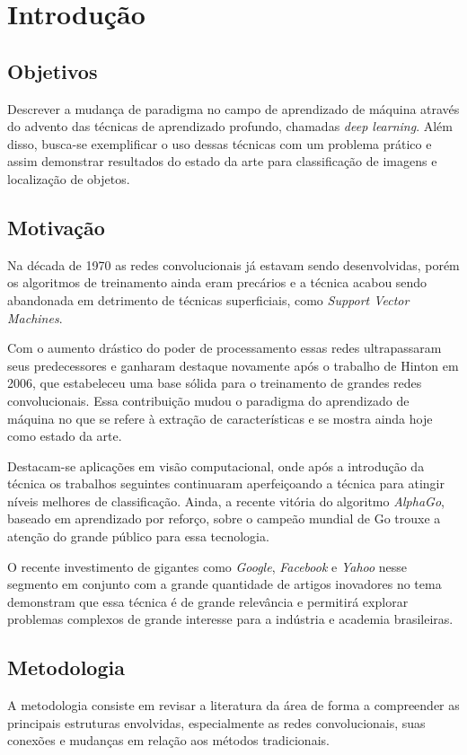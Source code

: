 \chapter{Introdução}

\section{Objetivos}
Descrever a mudança de paradigma no campo de aprendizado de máquina através do advento das técnicas de aprendizado profundo, chamadas \textit{deep learning}.  Além disso, busca­-se exemplificar o uso dessas técnicas com um problema prático e assim demonstrar resultados do estado da arte para classificação de imagens e localização de objetos.
 
\section{Motivação}
Na década de 1970 as redes convolucionais já estavam sendo desenvolvidas, porém os algoritmos de treinamento ainda eram precários e a técnica acabou sendo abandonada em detrimento de técnicas superficiais, como \textit{Support Vector Machines}.

Com o aumento drástico do poder de processamento essas redes ultrapassaram seus predecessores e ganharam destaque novamente após o trabalho de Hinton \cite{hintonDL} em 2006, que estabeleceu uma base sólida para o treinamento de grandes redes convolucionais. Essa contribuição mudou o paradigma do aprendizado de máquina no que se refere à extração de características e se mostra ainda hoje como estado da arte. 

Destacam-se aplicações em visão computacional, onde após a introdução da técnica os trabalhos seguintes continuaram aperfeiçoando a técnica para atingir níveis melhores de classificação. Ainda, a recente vitória do algoritmo \textit{AlphaGo}, baseado em aprendizado por reforço, sobre o campeão mundial de Go trouxe a atenção do grande público para essa tecnologia.

O recente investimento de gigantes como \textit{Google}, \textit{Facebook} e \textit{Yahoo} nesse segmento em conjunto com a grande quantidade de artigos inovadores no tema demonstram que essa técnica é de grande relevância e permitirá explorar problemas complexos de grande interesse para a indústria e academia brasileiras.

\section{Metodologia}
A metodologia consiste em revisar a literatura da área de forma a compreender as principais estruturas envolvidas, especialmente as redes convolucionais, suas conexões e mudanças em relação aos métodos tradicionais.

